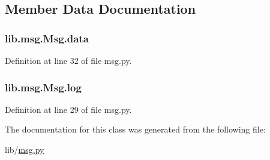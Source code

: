 \subsection{Member Data Documentation}
\subsubsection[{\texorpdfstring{data}{data}}]{\setlength{\rightskip}{0pt plus 5cm}lib.\+msg.\+Msg.\+data}\hypertarget{classlib_1_1msg_1_1_msg_abbc06ca8ca4607bac414f431d5a67c4c}{}\label{classlib_1_1msg_1_1_msg_abbc06ca8ca4607bac414f431d5a67c4c}


Definition at line 32 of file msg.\+py.

\subsubsection[{\texorpdfstring{log}{log}}]{\setlength{\rightskip}{0pt plus 5cm}lib.\+msg.\+Msg.\+log}\hypertarget{classlib_1_1msg_1_1_msg_a6e45a46787a73c3fefd6e40eaa3493cf}{}\label{classlib_1_1msg_1_1_msg_a6e45a46787a73c3fefd6e40eaa3493cf}


Definition at line 29 of file msg.\+py.



The documentation for this class was generated from the following file\+:\begin{DoxyCompactItemize}
\item 
lib/\hyperlink{msg_8py}{msg.\+py}\end{DoxyCompactItemize}
